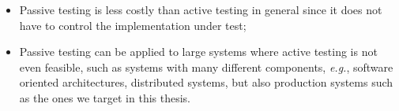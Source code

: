 \begin{itemize}
    \item Passive testing is less costly than active testing in
        general since it does not have to control the
        implementation under test;

    \item Passive testing can be applied to large systems where
        active testing is not even feasible, such as systems with
        many different components, \emph{e.g.}, software oriented
        architectures, distributed systems, but also production
        systems such as the ones we target in this thesis.
\end{itemize}
